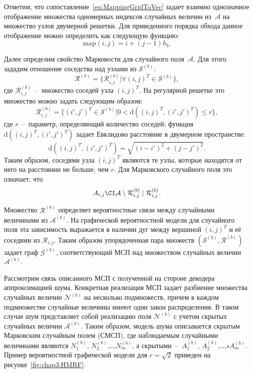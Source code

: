 Отметим, что сопоставление~\ref{eq:MappingGridToVec} задает взаимно однозначное отображение множества одномерных индексов случайных величин из~$\mathcal{A}$ на множество узлов двумерной решетки. Для приведенного порядка обхода данное отображение можно определить как следующую функцию:
\begin{equation}
\mathrm{map}(i,j) = i + (j-1)h_b.
\label{eq:MappingGridToVecFunction}
\end{equation}

Далее определим свойство Марковости для случайного поля~$\mathcal{A}$. Для этого зададим отношение соседства над узлами из $\mathcal{S}^{(b)}$:
\begin{equation*}
\mathcal{R}^{(b)} = \{ \mathcal{R}_{i,j}^{(b)} \vert \forall (i,j)^T \in \mathcal{S}^{(b)} \},
\end{equation*}
где $\mathcal{R}_{i,j}^{(b)}$~--~множество соседей узла $(i,j)^T$. На регулярной решетке это множество можно задать следующим образом:
\begin{equation*}
\mathcal{R}_{i,j}^{(b)} = \{ (i',j')^T \in \mathcal{S}^{(b)} \vert 0 < \mathrm{d}((i,j)^T,(i',j')^T) \leq r \},
\end{equation*}
где $r$~--~параметр, определяющий количество соседей; функция $\mathrm{d}((i,j)^T,(i',j')^T)$ задает Евклидово расстояние в двумерном пространстве:
\begin{equation*}
\mathrm{d}((i,j)^T,(i',j')^T) = \sqrt{(i-i')^2+(j-j')^2}.
\end{equation*}
Таким образом, соседями узла $(i,j)^T$ являются те узлы, которые находятся от него на расстоянии не больше, чем $r$. Для Марковского случайного поля это означает, что
\begin{equation}
    A_{i,j} \CI \mathcal{A}\setminus\mathcal{R}_{i,j}^{(b)} \mid \mathcal{R}_{i,j}^{(b)}.
\end{equation}

Множество $\mathcal{R}^{(b)}$ определяет вероятностные связи между случайными величинами из $\mathcal{A}^{(b)}$. На графической вероятностной модели для случайного поля эта зависимость выражается в наличии дуг между вершиной $(i,j)^T$ и её соседями из $\mathcal{R}_{i,j}$. Таким образом упорядоченная пара множеств $\left(\mathcal{S}^{(b)}, \mathcal{R}^{(b)}\right)$ задает граф $\mathcal{G}^{(b)}$, соответствующий МСП над множеством случайных величин~$\mathcal{A}^{(b)}$. 

Рассмотрим связь описанного МСП с полученной на стороне декодера аппроксимацией шума. Конкретная реализация МСП задает разбиение множества случайных величин  $\mathcal{N}^{(b)}$ на несколько подмножеств, причем в каждом подмножестве случайные величины имеют один закон распределения. В таком случае шум представляет собой реализацию поля $\mathcal{N}^{(b)}$ с учетом скрытых случайных величин $\mathcal{A}^{(b)}$. Таким образом, модель шума описывается скрытым Марковским случайным полем (СМСП), где наблюдаемым случайными величинами являются $N_1^{(b)}$, $N_2^{(b)}$,\ldots,$N_m^{(b)}$, а скрытыми~--~$A_1^{(b)}$, $A_2^{(b)}$,\ldots,$sA_m^{(b)}$. Пример вероятностной графической модели для $r=\sqrt{2}$ приведен на рисунке~\ref{fig:chap3:HMRF}.

